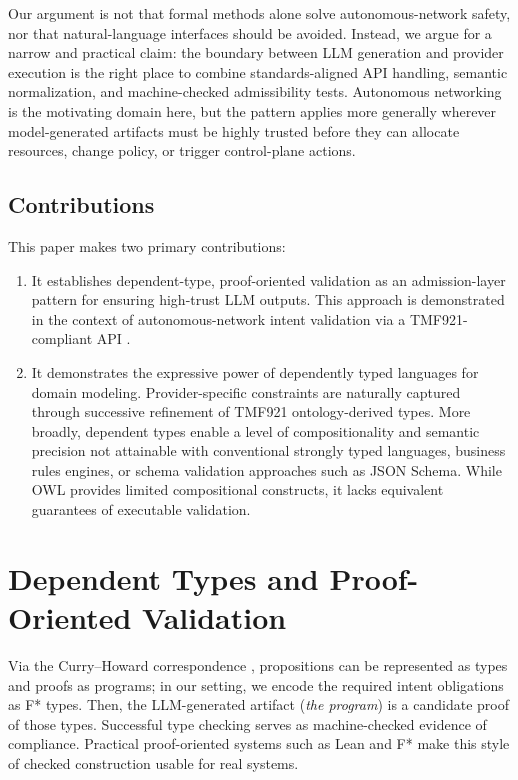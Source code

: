 \documentclass[conference]{IEEEtran}
\begin{document}
Our argument is not that formal methods alone solve autonomous-network safety, nor that natural-language interfaces should be avoided. Instead, we argue for a narrow and practical claim: the boundary between LLM generation and provider execution is the right place to combine standards-aligned API handling, semantic normalization, and machine-checked admissibility tests. Autonomous networking is the motivating domain here, but the pattern applies more generally wherever model-generated artifacts must be highly trusted before they can allocate resources, change policy, or trigger control-plane actions.

\subsection{Contributions}

This paper makes two primary contributions:
\begin{enumerate}
\item It establishes dependent-type, proof-oriented validation as an admission-layer pattern for ensuring high-trust LLM outputs. This approach is demonstrated in the context of autonomous-network intent validation via a TMF921-compliant API \cite{tmf921_spec,tr292_tio}.
\item It demonstrates the expressive power of dependently typed languages for domain modeling. Provider-specific constraints are naturally captured through successive refinement of TMF921 ontology-derived types. More broadly, dependent types enable a level of compositionality and semantic precision not attainable with conventional strongly typed languages, business rules engines, or schema validation approaches such as JSON Schema. While OWL provides limited compositional constructs, it lacks equivalent guarantees of executable validation.
\end{enumerate}

\section{Dependent Types and Proof-Oriented Validation}

Via the Curry--Howard correspondence \cite{propositions_as_types}, propositions can be represented as types and proofs as programs; in our setting, we encode the required intent obligations as F* types. Then, the LLM-generated artifact (\textit{the program}) is a candidate proof of those types. Successful type checking serves as machine-checked evidence of compliance. Practical proof-oriented systems such as Lean \cite{lean_theorem_prover} and F* \cite{fstar_popl} make this style of checked construction usable for real systems.
\end{document}
